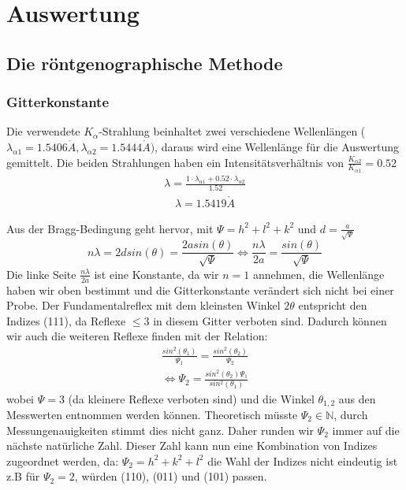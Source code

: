 \section{Auswertung}
    \subsection{Die röntgenographische Methode}
        \subsubsection{Gitterkonstante}
            Die verwendete $K_{\alpha}$-Strahlung beinhaltet zwei verschiedene Wellenlängen ($\lambda_{\alpha 1} = 1.5406 \mathring{A}, \lambda_{\alpha 2} = 1.5444 \mathring{A})$,
            daraus wird eine Wellenlänge
            für die Auswertung gemittelt. Die beiden Strahlungen haben ein Intensitätsverhältnis von $\frac{K_{\alpha 2}}{K_{\alpha 1}} = 0.52$
            \begin{align}
                \lambda = \frac{1 \cdot \lambda_{\alpha 1} + 0.52 \cdot \lambda_{\alpha 2}}{1.52}
            \end{align}
            \begin{align*}
                \lambda = 1.5419 \mathring{A}
            \end{align*}

            Aus der Bragg-Bedingung geht hervor, mit $\Psi =  h^2 + l^2 + k^2$ und $d = \frac{a}{\sqrt{\Psi}}$
            \begin{equation}
                n \lambda = 2dsin(\theta) = \frac{2asin(\theta)}{\sqrt{\Psi}} \Leftrightarrow \frac{n \lambda}{2a} = \frac{sin(\theta)}{\sqrt{\Psi}}
            \end{equation}
            Die linke Seite $\frac{n \lambda}{2a}$ ist eine Konstante, da wir $n=1$ annehmen, die Wellenlänge haben wir oben 
            bestimmt und die Gitterkonstante verändert sich nicht bei einer Probe. Der Fundamentalreflex mit dem kleinsten Winkel
            $2\theta$ entspricht den Indizes (111), da Reflexe $\leq 3$ in diesem Gitter
            verboten sind. Dadurch können wir auch die 
            weiteren Reflexe finden mit der Relation:
            \begin{align}
                \frac{sin^2(\theta_1)}{\Psi_1} = \frac{sin^2(\theta_2)}{\Psi_2} \\
                \Leftrightarrow \Psi_2 = \frac{sin^2(\theta_2)\Psi_1}{sin^2(\theta_1)}
            \end{align}
            wobei $\Psi = 3$ (da kleinere Reflexe verboten sind) und die Winkel $\theta_{1,2}$ aus den Messwerten entnommen werden können. Theoretisch
            müsste $\Psi_2 \in \mathbb{N}$, durch Messungenauigkeiten stimmt dies nicht ganz. Daher runden wir $\Psi_2$ immer auf die 
            nächste natürliche Zahl. Dieser Zahl kann nun eine Kombination von Indizes zugeordnet werden, da:
            $\Psi_2 = h^2+k^2+l^2$ die Wahl der Indizes nicht eindeutig ist z.B für $\Psi_2 = 2$, würden (110), (011) und (101) passen.
            
